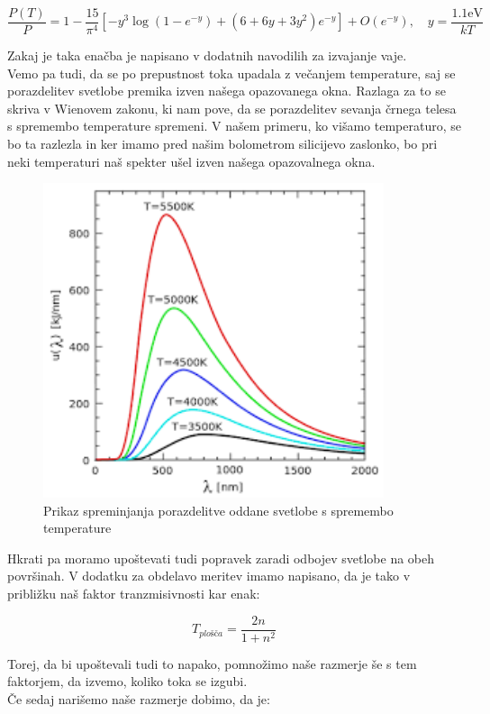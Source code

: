\documentclass[11pt, a4paper]{article}
\theoremstyle{definition}
\theoremstyle{example}
\theoremstyle{izrek}
\begin{document}
$$\frac{P(T)}{P}=1-\frac{15}{\pi^{4}}\left[-y^{3} \log \left(1-e^{-y}\right)+\left(6+6 y+3 y^{2}\right) e^{-y}\right]+O\left(e^{-y}\right), \quad y=\frac{1.1 \mathrm{eV}}{k T}$$

Zakaj je taka enačba je napisano v dodatnih navodilih za izvajanje vaje. \\

Vemo pa tudi, da se po prepustnost toka upadala z večanjem temperature, saj se porazdelitev svetlobe premika izven našega opazovanega okna. Razlaga za to se skriva v Wienovem zakonu, ki nam pove, da se porazdelitev sevanja črnega telesa s spremembo temperature spremeni. V našem primeru, ko višamo temperaturo, se bo ta razlezla in ker imamo pred našim bolometrom silicijevo zaslonko, bo pri neki temperaturi naš spekter ušel izven našega opazovalnega okna.
 
\begin{figure}[H]
	\centering
    \includegraphics[width=10cm]{Wienov zakon.png}
    \caption{Prikaz spreminjanja porazdelitve oddane svetlobe s spremembo temperature}
\end{figure}
    
Hkrati pa moramo upoštevati tudi popravek zaradi odbojev svetlobe na obeh površinah. V dodatku za obdelavo meritev imamo napisano, da je tako v približku naš faktor tranzmisivnosti kar enak: 

$$T_{plošča}=\frac{2n}{1+n^2}$$

Torej, da bi upoštevali tudi to napako, pomnožimo naše razmerje še s tem faktorjem, da izvemo, koliko toka se izgubi. \\

Če sedaj narišemo naše razmerje dobimo, da je:\\
\bigskip
\end{document}
